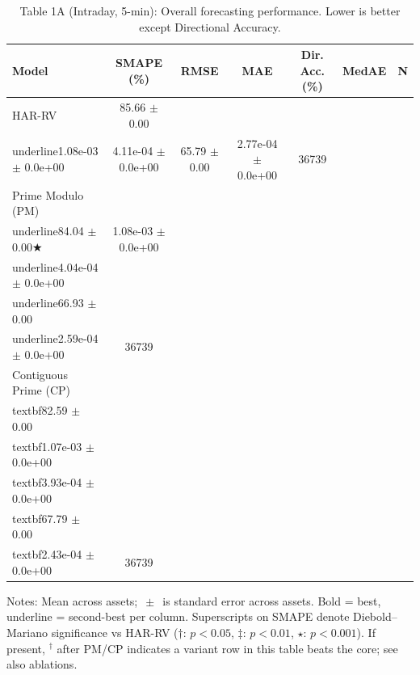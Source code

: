 \begin{table}[t]
\centering
\caption{Table 1A (Intraday, 5-min): Overall forecasting performance. Lower is better except Directional Accuracy.}
\label{tab:overall_intraday}
\begin{tabular}{lcccccc}
\toprule
Model & SMAPE (\%) & RMSE & MAE & Dir. Acc. (\%) & MedAE & N \\
\midrule
HAR-RV & 85.66 $\pm$ 0.00 & \\underline{1.08e-03 $\pm$ 0.0e+00} & 4.11e-04 $\pm$ 0.0e+00 & 65.79 $\pm$ 0.00 & 2.77e-04 $\pm$ 0.0e+00 & 36739 \\
Prime Modulo (PM) & \\underline{84.04 $\pm$ 0.00★} & 1.08e-03 $\pm$ 0.0e+00 & \\underline{4.04e-04 $\pm$ 0.0e+00} & \\underline{66.93 $\pm$ 0.00} & \\underline{2.59e-04 $\pm$ 0.0e+00} & 36739 \\
Contiguous Prime (CP) & \\textbf{82.59 $\pm$ 0.00} & \\textbf{1.07e-03 $\pm$ 0.0e+00} & \\textbf{3.93e-04 $\pm$ 0.0e+00} & \\textbf{67.79 $\pm$ 0.00} & \\textbf{2.43e-04 $\pm$ 0.0e+00} & 36739 \\
\bottomrule
\end{tabular}
\vspace{2pt}\par\footnotesize Notes: Mean across assets; $\,\pm\,$ is standard error across assets. Bold = best, underline = second-best per column. Superscripts on SMAPE denote Diebold--Mariano significance vs HAR-RV ($\dagger$: $p<0.05$, $\ddagger$: $p<0.01$, $\star$: $p<0.001$). If present, $^\dagger$ after PM/CP indicates a variant row in this table beats the core; see also ablations.
\end{table}